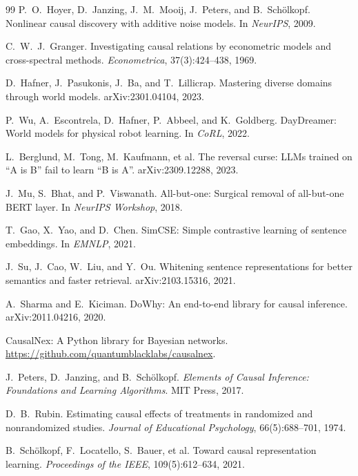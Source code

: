 \documentclass[11pt,a4paper]{article}
\begin{document}
\begin{thebibliography}{99}
P.~O.~Hoyer, D.~Janzing, J.~M.~Mooij, J.~Peters, and B.~Sch\"{o}lkopf.
\newblock Nonlinear causal discovery with additive noise models.
\newblock In \textit{NeurIPS}, 2009.

C.~W.~J.~Granger.
\newblock Investigating causal relations by econometric models and cross-spectral methods.
\newblock \textit{Econometrica}, 37(3):424--438, 1969.

D.~Hafner, J.~Pasukonis, J.~Ba, and T.~Lillicrap.
\newblock Mastering diverse domains through world models.
\newblock arXiv:2301.04104, 2023.

P.~Wu, A.~Escontrela, D.~Hafner, P.~Abbeel, and K.~Goldberg.
\newblock DayDreamer: World models for physical robot learning.
\newblock In \textit{CoRL}, 2022.

L.~Berglund, M.~Tong, M.~Kaufmann, et al.
\newblock The reversal curse: LLMs trained on ``A is B'' fail to learn ``B is A''.
\newblock arXiv:2309.12288, 2023.

J.~Mu, S.~Bhat, and P.~Viswanath.
\newblock All-but-one: Surgical removal of all-but-one BERT layer.
\newblock In \textit{NeurIPS Workshop}, 2018.

T.~Gao, X.~Yao, and D.~Chen.
\newblock SimCSE: Simple contrastive learning of sentence embeddings.
\newblock In \textit{EMNLP}, 2021.

J.~Su, J.~Cao, W.~Liu, and Y.~Ou.
\newblock Whitening sentence representations for better semantics and faster retrieval.
\newblock arXiv:2103.15316, 2021.

A.~Sharma and E.~Kiciman.
\newblock DoWhy: An end-to-end library for causal inference.
\newblock arXiv:2011.04216, 2020.

CausalNex: A Python library for Bayesian networks.
\newblock \url{https://github.com/quantumblacklabs/causalnex}.

J.~Peters, D.~Janzing, and B.~Sch\"{o}lkopf.
\newblock \textit{Elements of Causal Inference: Foundations and Learning Algorithms}.
\newblock MIT Press, 2017.

D.~B.~Rubin.
\newblock Estimating causal effects of treatments in randomized and nonrandomized studies.
\newblock \textit{Journal of Educational Psychology}, 66(5):688--701, 1974.

B.~Sch\"{o}lkopf, F.~Locatello, S.~Bauer, et al.
\newblock Toward causal representation learning.
\newblock \textit{Proceedings of the IEEE}, 109(5):612--634, 2021.


\end{thebibliography}
\end{document}
